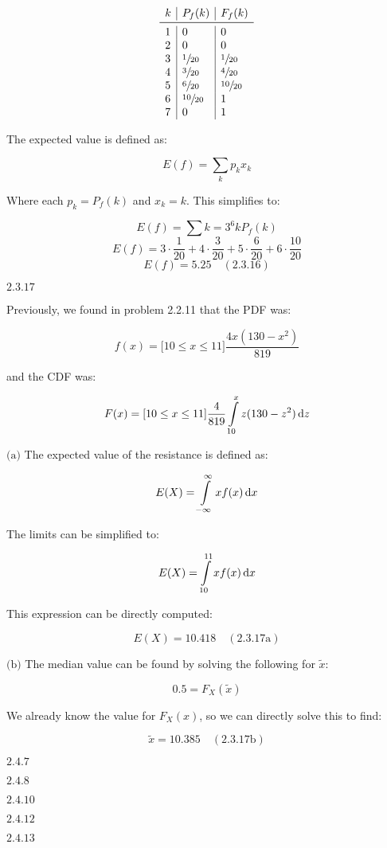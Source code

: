 \documentclass{article}
\newcommand{\problem}[2]{$\boxed{\text{#1.#2}}$}
\newcommand{\subproblem}[3]{$\boxed{\text{(#3)}}$}
\newcommand{\solution}[3]{\boxed{#3\quad(\text{#1.#2})}}
\newcommand{\subsolution}[4]{\boxed{#4\quad(\text{#1.#2#3})}}
\renewcommand{\d}[1]{\,\textnormal{d}#1}
\begin{document}
\[
\begin{array}{l|l|l}
k & P_f(k) & F_f(k) \\
\midrule
1 & 0 & 0 \\
2 & 0 & 0 \\
3 & \sfrac{1}{20} & \sfrac{1}{20} \\
4 & \sfrac{3}{20} & \sfrac{4}{20} \\
5 & \sfrac{6}{20} & \sfrac{10}{20} \\
6 & \sfrac{10}{20} & 1 \\
7 & 0 & 1 \\
\end{array}
\]

The expected value is defined as:

\[
E(f)=\sum\limits_k p_k x_k
\]

Where each $p_k=P_f(k)$ and $x_k=k$. This simplifies to:

\[
E(f)=\sum\limits{k=3}^6 k P_f(k)
\] \[
E(f)=3\cdot\frac{1}{20}+4\cdot\frac{3}{20}+5\cdot\frac{6}{20}+6\cdot\frac{10}{20}
\] \[
\solution{2.3}{16}{E(f)=5.25}
\]

%
\problem{2.3}{17}

Previously, we found in problem 2.2.11 that the PDF was:

\[
f(x)=\lbrack10\le x\le11\rbrack \frac{4x(130-x^2)}{819}
\]

and the CDF was:

\[
F(x)=\lbrack10\le x\le11\rbrack \frac{4}{819}\int\limits_{10}^x z(130-z^2)\d{z}
\]

%
\subproblem{2.3}{17}{a} The expected value of the resistance is
defined as:

\[
E(X)=\int\limits_{-\infty}^\infty x f(x)\d{x}
\]

The limits can be simplified to:

\[
E(X)=\int\limits_{10}^{11} x f(x)\d{x}
\]

This expression can be directly computed:

\[
\subsolution{2.3}{17}{a}{E(X)=10.418}
\]

%
\subproblem{2.3}{17}{b} The median value can be found by solving the
following for $\tilde{x}$:

\[
0.5=F_X(\tilde{x})
\]

We already know the value for $F_X(x)$, so we can directly solve this
to find:

\[
\subsolution{2.3}{17}{b}{\tilde{x}=10.385}
\]

%
\problem{2.4}{7}

%
\problem{2.4}{8}

%
\problem{2.4}{10}

%
\problem{2.4}{12}

%
\problem{2.4}{13}
\end{document}
